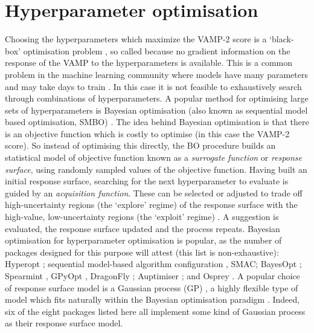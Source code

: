 \section{Hyperparameter optimisation}\label{sec:intro_hyper_opt}
Choosing the hyperparameters which maximize the VAMP-2 score is a `black-box' optimisation problem \cite{jonesEfficientGlobalOptimization1998a}, so called because no gradient information on the response of the VAMP to the hyperparameters is available. This is a common problem in the machine learning community where models have many parameters and may take days to train \cite{feurer2019hyperparameter}. In this case it is not feasible to exhaustively search through combinations of hyperparameters. A popular method for optimising large sets of hyperparameters is Bayesian optimisation (also known as sequential model based optimisation, SMBO) \cite{hutterSequentialModelbasedOptimization2011,NIPS2012_4522,bergstraAlgorithmsHyperParameterOptimizationa,bergstraMakingScienceModel2013}. The idea behind Bayesian optimisation is that there is an objective function which is costly to optimise \cite{brochuTutorialBayesianOptimization2010,shahriariTakingHumanOut2016} (in this case the VAMP-2 score). So instead of optimising this directly, the BO procedure builds an statistical model of  objective function known as a \emph{surrogate function} or \emph{response surface}, using randomly sampled  values of the objective function. Having built an initial response surface, searching for the next hyperparameter to evaluate is guided by an \emph{acquisition function}. These can be selected or adjusted to trade off high-uncertainty regions (the `explore' regime) of the response surface with the high-value, low-uncertainty  regions (the `exploit' regime) \cite{shahriariTakingHumanOut2016}. A suggestion is evaluated, the response surface updated and the process repeats. Bayesian optimisation for hyperparameter optimisation is popular, as the number of packages designed for this purpose will attest (this list is non-exhaustive): Hyperopt \cite{bergstraHyperoptPythonLibrary2013}; sequential model-based algorithm configuration \cite{hutterSequentialModelbasedOptimization2011}, SMAC; BayesOpt \cite{martinez-cantinBayesOptBayesianOptimization2014}; Spearmint \cite{DBLP:conf/uai/GelbartSA14,snoekAbstractBayesianOptimization2013,snoekInputWarpingBayesian2014a,NIPS2013_5086,NIPS2012_4522}, GPyOpt \cite{gpyopt2016}, DragonFly \cite{JMLR:v21:18-223}; Auptimiser \cite{liuAuptimizerExtensibleOpenSource2019}; and Osprey \cite{mcgibbonOspreyHyperparameterOptimization2016}. A popular choice of response surface model is a Gaussian process (GP) \cite{rasmussenGaussianProcessesMachine2006}, a highly flexible type of model which fits naturally within the Bayesian optimisation paradigm \cite{shahriariTakingHumanOut2016}. Indeed, six of the eight packages listed here all implement some kind of Gaussian process  as their response surface model.

